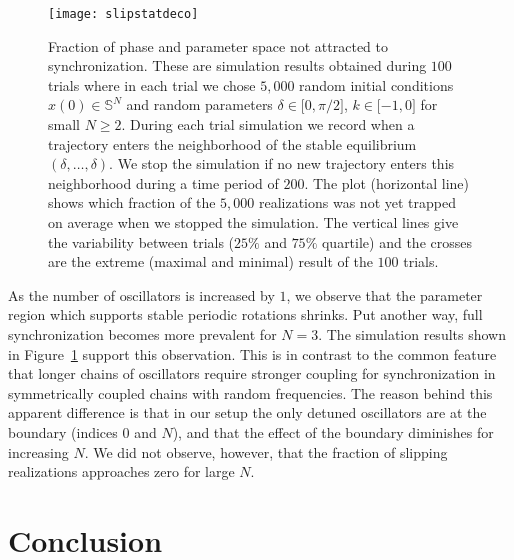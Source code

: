 \documentclass[aps,pre,twocolumn,a4paper,showkeys,showpacs]{revtex4}\usepackage{color}
\theoremstyle{plain}
\theoremstyle{plain}
\begin{document}
\begin{figure}[th]
\centering
\texttt{[image: slipstatdeco]}  \caption{Fraction of
phase and parameter space not attracted to synchronization. These are
simulation results obtained during $100$ trials where in each trial we chose
$5,000$ random initial conditions $x(0)\in\mathbb{S}^{N}$ and random
parameters $\delta\in\lbrack0,\pi/2]$, $k\in\lbrack-1,0]$ for small $N\geq2$.
During each trial simulation we record when a trajectory enters the
neighborhood of the stable equilibrium $(\delta,\ldots,\delta)$. We stop the
simulation if no new trajectory enters this neighborhood during a time period
of $200$. The plot (horizontal line) shows which fraction of the $5,000$
realizations was not yet trapped on average when we stopped the simulation.
The vertical lines give the variability between trials ($25\%$ and $75\%$
quartile) and the crosses are the extreme (maximal and minimal) result of the
$100$ trials.}\label{fig:slipstats}\end{figure}As the number of oscillators is increased by $1$, we observe that
the parameter region which supports stable periodic rotations shrinks. Put
another way, full synchronization becomes more prevalent for $N=3$. The
simulation results shown in Figure~\ref{fig:slipstats} support this
observation. This is in contrast to the common feature that longer chains of
oscillators require stronger coupling for synchronization
\cite{hoppensteadt1997weakly,Hong2005} in symmetrically coupled chains with
random frequencies. The reason behind this apparent difference is that in our
setup the only detuned oscillators are at the boundary (indices $0$ and $N$),
and that the effect of the boundary diminishes for increasing $N$. We did not
observe, however, that the fraction of slipping realizations approaches zero
for large $N$.

\section{Conclusion}
\end{document}
